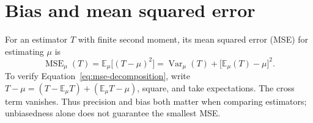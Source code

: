 \section{Bias and mean squared error}
For an estimator $T$ with finite second moment, its mean squared error (MSE)
for estimating $\mu$ is
\begin{equation}
  \label{eq:mse-decomposition}
  \operatorname{MSE}_{\mu}(T)
  = \mathbb{E}_{\mu}\bigl[(T-\mu)^2\bigr]
  = \operatorname{Var}_{\mu}(T)
    +\bigl[\mathbb{E}_{\mu}(T)-\mu\bigr]^2.
\end{equation}
To verify Equation~\eqref{eq:mse-decomposition}, write
$T-\mu=(T-\mathbb{E}_{\mu}T)+(\mathbb{E}_{\mu}T-\mu)$, square, and take
expectations. The cross term vanishes. Thus precision and bias both matter
when comparing estimators; unbiasedness alone does not guarantee the smallest
MSE.
